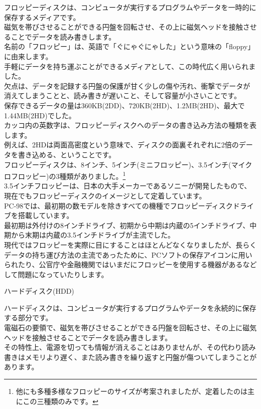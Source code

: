 \documentclass[b5paper,9pt,platex,dvipdfmx]{jsarticle}
\begin{document}
\begin{multicols*}{3}
\begin{enumerate}
  フロッピーディスクは、コンピュータが実行するプログラムやデータを一時的に保存するメディアです。\\
  磁気を帯びさせることができる円盤を回転させ、その上に磁気ヘッドを接触させることでデータを読み書きします。\\
  名前の「フロッピー」は、英語で「ぐにゃぐにゃした」という意味の「floppy」に由来します。\\
  手軽にデータを持ち運ぶことができるメディアとして、この時代広く用いられました。\\
  欠点は、データを記録する円盤の保護が甘く少しの傷や汚れ、衝撃でデータが消えてしまうことと、読み書きが遅いこと、そして容量が小さいことです。\\
  保存できるデータの量は360KB(2DD)、720KB(2HD)、1.2MB(2HD)、最大で1.44MB(2HD)でした。\\
  カッコ内の英数字は、フロッピーディスクへのデータの書き込み方法の種類を表します。\\
  例えば、2HDは両面高密度という意味で、ディスクの面裏それぞれに2倍のデータを書き込める、ということです。\\
  フロッピーディスクは、8インチ、5インチ(ミニフロッピー)、3.5インチ(マイクロフロッピー)の3種類がありました。\footnote{他にも多種多様なフロッピーのサイズが考案されましたが、定着したのは主にこの三種類のみです。}\\
  3.5インチフロッピーは、日本の大手メーカーであるソニーが開発したもので、現在でもフロッピーディスクのイメージとして定着しています。\\
  PC-98では、最初期の数モデルを除きすべての機種でフロッピーディスクドライブを搭載しています。\\
  最初期は外付けの8インチドライブ、初期から中期は内蔵の5インチドライブ、中期から末期は内蔵の3.5インチドライブが主流でした。\\
  現代ではフロッピーを実際に目にすることはほとんどなくなりましたが、長らくデータの持ち運び方法の主流であったために、PCソフトの保存アイコンに用いられたり、公官庁や金融機関ではいまだにフロッピーを使用する機器があるなどして問題になっていたりします。
  {\bf  \item ハードディスク(HDD)\\}
  ハードディスクは、コンピュータが実行するプログラムやデータを永続的に保存する部分です。\\
  電磁石の要領で、磁気を帯びさせることができる円盤を回転させ、その上に磁気ヘッドを接触させることでデータを読み書きします。\\
  その特性上、電源を切っても情報が消えることはありませんが、その代わり読み書きはメモリより遅く、また読み書きを繰り返すと円盤が傷ついてしまうことがあります。\\

\end{enumerate}
\end{multicols*}
\end{document}

